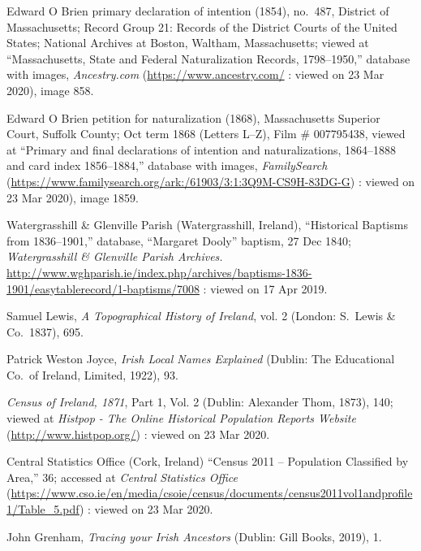 \textbf{}\begin{thebibliography}{999}
\raggedright
\small

	Edward O Brien primary declaration of intention (1854), no.\ 487, 
	District of Massachusetts; 
	Record Group 21: Records of the District Courts of the United States; 
	National Archives at Boston, Waltham, Massachusetts;
	viewed at ``Massachusetts, State and Federal Naturalization Records, 1798--1950,''
	database with images, \textit{Ancestry.com} (\url{https://www.ancestry.com/} : viewed on 23 Mar 2020), image 858.
	
	Edward O Brien petition for naturalization (1868), 
	Massachusetts Superior Court, Suffolk County; 
	Oct term 1868 (Letters L--Z), Film \# 007795438,
	viewed at ``Primary and final declarations of intention and naturalizations, 1864--1888 and card index 1856--1884,''
	database with images, \textit{FamilySearch} (\url{https://www.familysearch.org/ark:/61903/3:1:3Q9M-CS9H-83DG-G}) : viewed on 23 Mar 2020), image 1859.
	
	Watergrasshill \& Glenville Parish (Watergrasshill, Ireland), ``Historical Baptisms from 1836--1901,'' database, ``Margaret Dooly'' baptism, 27 Dec 1840; \textit{Watergrasshill \& Glenville Parish Archives.} \url{http://www.wghparish.ie/index.php/archives/baptisms-1836-1901/easytablerecord/1-baptisms/7008} : viewed on 17 Apr 2019.
	
	Samuel Lewis, \textit{A Topographical History of Ireland}, vol. 2 (London: S.\ Lewis \& Co.\, 1837), 695.
	
	Patrick Weston Joyce, \textit{Irish Local Names Explained} (Dublin: The Educational Co.\ of Ireland, Limited, 1922), 93.
	
	\textit{Census of Ireland, 1871}, Part 1, Vol. 2 (Dublin: Alexander Thom, 1873), 140; viewed at \textit{Histpop - The Online Historical Population Reports Website} (\url{http://www.histpop.org/}) : viewed on 23 Mar 2020.
	
	Central Statistics Office (Cork, Ireland) ``Census 2011 -- Population Classified by Area,'' 36; accessed at \textit{Central Statistics Office} (\url{https://www.cso.ie/en/media/csoie/census/documents/census2011vol1andprofile1/Table_5.pdf}) : viewed on 23 Mar 2020.
	
	John Grenham, \textit{Tracing your Irish Ancestors} (Dublin: Gill Books, 2019), 1.
	

\end{thebibliography}
